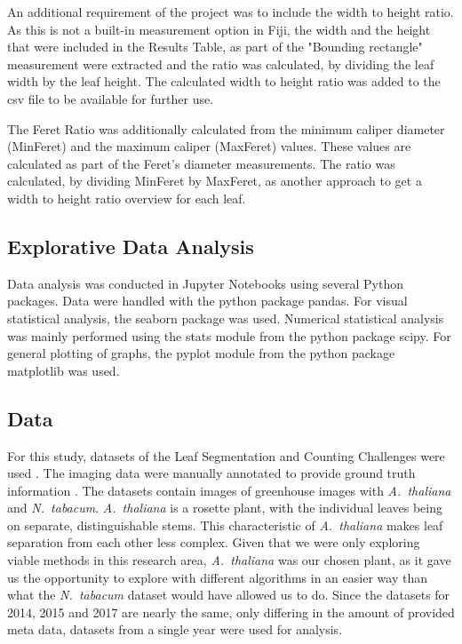 \documentclass[paper=A4,bibliography=totocnumbered]{scrartcl}
\begin{document}
An additional requirement of the project was to include the width to height ratio. As this is not a built-in measurement option in Fiji, the width and the height that were included in the Results Table, as part of the "Bounding rectangle" measurement were extracted and the ratio was calculated, by dividing the leaf width by the leaf height. The calculated width to height ratio was added to the csv file to be available for further use.

The Feret Ratio was additionally calculated from the minimum caliper diameter (MinFeret) and the maximum caliper (MaxFeret) values. These values are calculated as part of the Feret's diameter measurements. The ratio was calculated, by dividing MinFeret by MaxFeret, as another approach to get a width to height ratio overview for each leaf.

\subsection{Explorative Data Analysis}
Data analysis was conducted in Jupyter Notebooks using several Python packages. Data were handled with the python package pandas. For visual statistical analysis, the seaborn package was used. Numerical statistical analysis was mainly performed using the stats module from the python package scipy. For general plotting of graphs, the pyplot module from the python package matplotlib was used.

\subsection{Data}
For this study, datasets of the Leaf Segmentation and Counting Challenges were used \citep{Minervini.2016}. The imaging data were manually annotated to provide ground truth information \citep{Scharr.2014}. The datasets contain images of greenhouse images with \textit{A.~thaliana} and \textit{N.~tabacum}. \textit{A.~thaliana} is a rosette plant, with the individual leaves being on separate, distinguishable stems. This characteristic of \textit{A.~thaliana} makes leaf separation from each other less complex.  Given that we were only exploring viable methods in this research area, \textit{A.~thaliana} was our chosen plant, as it gave us the opportunity to explore with different algorithms in an easier way than what the \textit{N.~tabacum} dataset would have allowed us to do. Since the datasets for 2014, 2015 and 2017 are nearly the same, only differing in the amount of provided meta data, datasets from a single year were used for analysis. 
\end{document}
